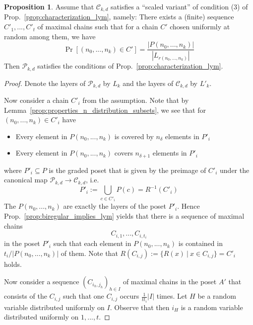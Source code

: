 \documentclass{scrartcl}
\theoremstyle{definition}
\newtheorem{proposition}[definition]{Proposition}
\begin{document}
\begin{proposition}
    \label{prop:core_of_multisets}
    Assume that $\mathcal{C}_{k, d}$ satisfies a ``scaled variant'' of condition (3) of Prop.~\ref{prop:characterization_lym}, namely:
    There exists a (finite) sequence $C'_1, ..., C'_t$ of maximal chains such that for a chain $C'$ chosen uniformly at random among them, we have
    \begin{equation*}
        \Pr[ (n_0, ..., n_k) \in C' ] = \frac {|P(n_0, ..., n_k)|} {|L_{r(n_0, ..., n_k)}|}
    \end{equation*}
    Then $\mathcal{P}_{k, d}$ satisfies the conditions of Prop.~\ref{prop:characterization_lym}.
\end{proposition}
\begin{proof}
    Denote the layers of $\mathcal{P}_{k, d}$ by $L_k$ and the layers of $\mathcal{C}_{k, d}$ by $L'_k$.

    Now consider a chain $C'_i$ from the assumption.
    Note that by Lemma~\ref{prop:properties_n_distribution_subsets}, we see that for $(n_0, ..., n_k) \in C'_i$ have
    \begin{itemize}
        \item Every element in $P(n_0, ..., n_k)$ is covered by $n_\delta$ elements in $P'_i$
        \item Every element in $P(n_0, ..., n_k)$ covers $n_{\delta + 1}$ elements in $P'_i$
    \end{itemize}
    where $P'_i \subseteq P$ is the graded poset that is given by the preimage of $C'_i$ under the canonical map $\mathcal{P}_{k, d} \to \mathcal{C}_{k, d}$, i.e.
    \begin{equation*}
        P'_i := \bigcup_{c \in C'_i} P(c) = R^{-1}(C'_i)
    \end{equation*}
    The $P(n_0, ..., n_k)$ are exactly the layers of the poset $P'_i$.
    Hence Prop.~\ref{prop:biregular_implies_lym} yields that there is a sequence of maximal chains
    \begin{equation*}
        C_{i, 1}, ..., C_{i, t_i}
    \end{equation*}
    in the poset $P'_i$ such that each element in $P(n_0, ..., n_k)$ is contained in $t_i/|P(n_0, ..., n_k)|$ of them.
    Note that $R(C_{i, j}) := \{ R(x) \ | \ x \in C_{i, j} \} = C'_i$ holds.

    Now consider a sequence $(C_{i_h, j_h})_{h \in I}$ of maximal chains in the poset $A'$ that consists of the $C_{i, j}$ such that one $C_{i, j}$ occurs $\frac 1 {t t_i} |I|$ times.
    Let $H$ be a random variable distributed uniformly on $I$.
    Observe that then $i_H$ is a random variable distributed uniformly on $1, ..., t$.


\end{proof}
\end{document}
